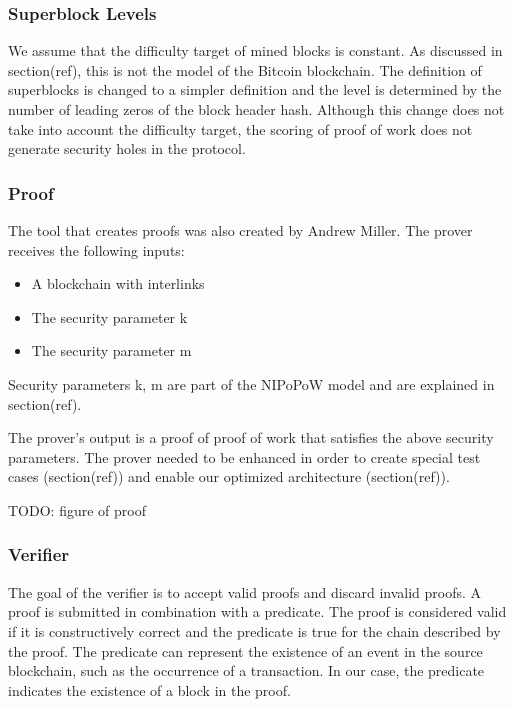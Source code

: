\documentclass{article}
\begin{document}
  \subsubsection{Superblock Levels}

  We assume that the difficulty target of mined blocks is constant. As
  discussed in section(ref), this is not the model of the Bitcoin
  blockchain. The definition of superblocks is changed to a simpler
  definition and the level is determined by the number of leading zeros
  of the block header hash. Although this change does not take into
  account the difficulty target, the scoring of proof of work does not
  generate security holes in the protocol.

  \subsubsection{Proof}

  The tool that creates proofs was also created by Andrew Miller. The
  prover receives the following inputs:

  \begin{itemize}
  \item
    A blockchain with interlinks
  \item
    The security parameter k
  \item
    The security parameter m
  \end{itemize}

  Security parameters k, m are part of the NIPoPoW model and are
  explained in section(ref).

  The prover’s output is a proof of proof of work that satisfies the
  above security parameters. The prover needed to be enhanced in order
  to create special test cases (section(ref)) and enable our optimized
  architecture (section(ref)).

  TODO: figure of proof

  \subsubsection{Verifier}

  The goal of the verifier is to accept valid proofs and discard invalid
  proofs. A proof is submitted in combination with a predicate. The
  proof is considered valid if it is constructively correct and the
  predicate is true for the chain described by the proof. The predicate
  can represent the existence of an event in the source blockchain, such
  as the occurrence of a transaction. In our case, the predicate
  indicates the existence of a block in the proof.
\end{document}
